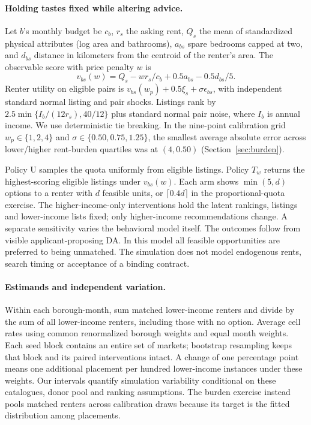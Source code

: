 \paragraph{Holding tastes fixed while altering advice.}
Let $b$'s monthly budget be $c_b$, $r_s$ the asking rent, $Q_s$ the mean of standardized physical attributes (log area and bathrooms), $a_{bs}$ spare bedrooms capped at two, and $d_{bs}$ distance in kilometers from the centroid of the renter's area. The observable score with price penalty $w$ is
\[
   v_{bs}(w)=Q_s-wr_s/c_b+0.5a_{bs}-0.5d_{bs}/5 .
\]
Renter utility on eligible pairs is $v_{bs}(w_p)+0.5\xi_s+\sigma\epsilon_{bs}$, with independent standard normal listing and pair shocks. Listings rank by $2.5\min\{I_b/(12r_s),40/12\}$ plus standard normal pair noise, where $I_b$ is annual income. We use deterministic tie breaking. In the nine-point calibration grid $w_p\in\{1,2,4\}$ and $\sigma\in\{0.50,0.75,1.25\}$, the smallest average absolute error across lower/higher rent-burden quartiles was at $(4,0.50)$ (Section~\ref{sec:burden}).

Policy U samples the quota uniformly from eligible listings. Policy $T_w$ returns the highest-scoring eligible listings under $v_{bs}(w)$. Each arm shows $\min(5,d)$ options to a renter with $d$ feasible units, or $\lceil0.4d\rceil$ in the proportional-quota exercise. The higher-income-only interventions hold the latent rankings, listings and lower-income lists fixed; only higher-income recommendations change. A separate sensitivity varies the behavioral model itself. The outcomes follow from visible applicant-proposing DA. In this model all feasible opportunities are preferred to being unmatched. The simulation does not model endogenous rents, search timing or acceptance of a binding contract.

\paragraph{Estimands and independent variation.}
Within each borough-month, sum matched lower-income renters and divide by the sum of all lower-income renters, including those with no option. Average cell rates using common renormalized borough weights and equal month weights. Each seed block contains an entire set of markets; bootstrap resampling keeps that block and its paired interventions intact. A change of one percentage point means one additional placement per hundred lower-income instances under these weights. Our intervals quantify simulation variability conditional on these catalogues, donor pool and ranking assumptions. The burden exercise instead pools matched renters across calibration draws because its target is the fitted distribution among placements.

